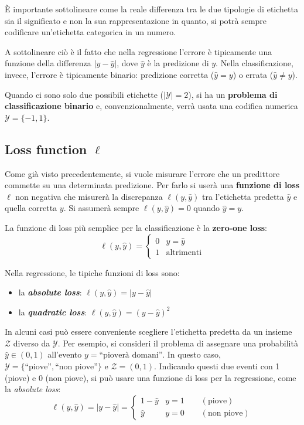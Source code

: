\documentclass[a4paper]{article}
\newcommand{\quotes}[1]{``#1''}
\newcommand{\Y}{\ensuremath{\mathcal{Y}}}
\newcommand{\Z}{\ensuremath{\mathcal{Z}}}
\newcommand{\loss}{\ensuremath{\ell}}
\begin{document}
È importante sottolineare come la reale differenza tra le due tipologie di etichetta sia il
significato e non la sua rappresentazione in quanto, si potrà sempre codificare
un'etichetta categorica in un numero.

A sottolineare ciò è il fatto che nella regressione l'errore è tipicamente una funzione della
differenza $| y-\hat{y} |$, dove $\hat{y}$ è la predizione di $y$. Nella classificazione, invece,
l'errore è tipicamente binario: predizione corretta ($\hat{y}=y$) o errata ($\hat{y}\neq y$).

Quando ci sono solo due possibili etichette ($|\Y|=2$), si ha un \textbf{problema di 
classificazione binario} e, convenzionalmente, verrà usata una codifica numerica 
$\Y=\{-1,1\}$.

\subsection{Loss function $\loss$}
Come già visto precedentemente, si vuole misurare l'errore che un predittore commette su una
determinata predizione. Per farlo si userà una \textbf{funzione di loss} $\loss$ non negativa 
che misurerà la discrepanza $\loss(y,\hat{y})$ tra l'etichetta predetta $\hat{y}$ e quella
corretta $y$. Si assumerà sempre $\loss(y,\hat{y})=0$ quando $\hat{y}=y$.

La funzione di loss più semplice per la classificazione è la \textbf{zero-one loss}:
$$ \loss(y,\hat{y}) = \begin{cases} 0 & y=\hat{y} \\ 1 & \text{altrimenti} \end{cases} $$

Nella regressione, le tipiche funzioni di loss sono:
\begin{itemize}
    \item la \textit{\textbf{absolute loss}}: $\loss(y,\hat{y}) = |y-\hat{y}|$
    \item la \textit{\textbf{quadratic loss}}: $\loss(y,\hat{y}) = (y-\hat{y})^2$
\end{itemize}

In alcuni casi può essere conveniente scegliere l'etichetta predetta da un insieme $\Z$ diverso 
da $\Y$. Per esempio, si consideri il problema di assegnare una probabilità $\hat{y}\in (0,1)$
all'evento $y=\text{\quotes{pioverà domani}}$. In questo caso, $\Y=\{\text{\quotes{piove}},
\text{\quotes{non piove}}\}$ e $\Z = (0,1)$. Indicando questi due eventi con 1 (piove) e 0 
(non piove), si può usare una funzione di loss per la regressione, come la 
\textit{absolute loss}:
$$ \loss(y,\hat{y}) = |y-\hat{y}| =  \begin{cases} 1-\hat{y} & y=1 \qquad (\text{piove}) \\
\hat{y} & y=0 \qquad (\text{non piove}) \end{cases} $$
\end{document}
